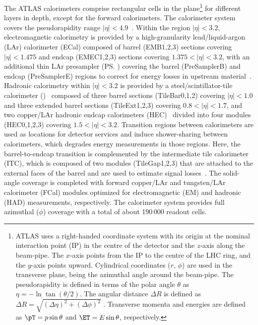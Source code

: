 The ATLAS calorimeters comprise rectangular cells in the
\etaphi plane\footnote{ATLAS uses a right-handed coordinate system with its origin at the nominal interaction point (IP) in the centre of the detector and the $z$-axis along the beam-pipe. The $x$-axis points from the IP to the centre of the LHC ring, and the $y$-axis points upward. Cylindrical coordinates ($r$, $\phi$) are used in the transverse plane, \phi being the azimuthal angle around the beam-pipe. The pseudorapidity is defined in terms of the polar angle $\theta$ as $\eta = -\ln{\tan(\theta/2)}$. The angular distance $\Delta R$ is defined as $\Delta R = \sqrt{(\Delta\eta)^{2} + (\Delta\phi)^{2}}$ . Transverse momenta and energies are defined as $\pT = p\sin\theta$ and $\ET = E\sin\theta$, respectively.} for different layers in depth, except for the forward calorimeters. The calorimeter system covers the pseudorapidity range \(|\eta| < 4.9\)~\cite{PERF-2007-01}. Within the region $|\eta|< 3.2$, electromagnetic calorimetry is provided by a high-granularity lead/liquid-argon (LAr) calorimeter (ECal) composed of barrel (EMB1,2,3) sections covering $|\eta|<1.475$ and endcap (EMEC1,2,3) sections covering $1.375<|\eta|<3.2$, with an additional thin LAr presampler (\ps) covering the barrel (PreSamplerB) and endcap (PreSamplerE) regions to correct for energy losses in upstream material~\cite{LARG-2009-01,larg_tdr}. Hadronic calorimetry within $|\eta|< 3.2$ is provided by a steel/scintillator-tile calorimeter (\tilecal)~\cite{TCAL-2017-01,tile_tdr} composed of three barrel sections (TileBar0,1,2) covering $|\eta| < 1.0$ and three extended barrel sections (TileExt1,2,3) covering $0.8<|\eta|< 1.7$, and two copper/LAr hadronic endcap calorimeters (HEC)~\cite{cal_tdr} divided into four modules (HEC0,1,2,3) covering $1.5<|\eta|< 3.2$. Transition regions between calorimeters are used as locations for detector services and induce shower-sharing between calorimeters, which degrades energy measurements in those regions. Here, the barrel-to-endcap transition is complemented by the intermediate tile calorimeter (ITC), which is composed of two modules (TileGap1,2,3) that are attached to the external faces of the barrel and are used to estimate signal losses~\cite{cal_tdr}. The solid-angle coverage is completed with forward
copper/LAr and tungsten/LAr calorimeter (FCal) modules optimized for electromagnetic (EM) and hadronic (HAD) measurements, respectively. The calorimeter system
provides full azimuthal ($\phi$) coverage with a total of about 190\,000 readout cells. 



